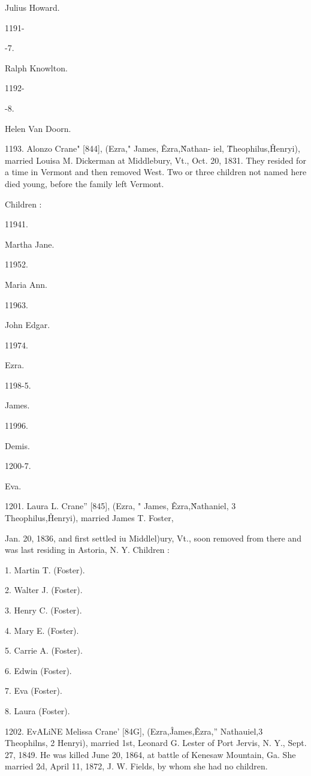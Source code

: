 Julius Howard. 


1191- 


-7. 


Ralph Knowlton. 


1192- 


-8. 


Helen Van Doorn. 



1193. Alonzo Crane" [844], (Ezra," James, \^ Ezra,\^ Nathan- 
iel, \^ Theophilus,\^ Henryi), married Louisa M. Dickerman at 
Middlebury, Vt., Oct. 20, 1831. They resided for a time in 
Vermont and then removed West. Two or three children not 
named here died young, before the family left Vermont. 

Children : 



11941. 


Martha Jane. 


11952. 


Maria Ann. 


11963. 


John Edgar. 


11974. 


Ezra. 


1198-5. 


James. 


11996. 


Demis. 


1200-7. 


Eva. 



1201. Laura L. Crane'' [845], (Ezra, " James, \^ Ezra,\^ 
Nathaniel, 3 Theophilus,\^ Henryi), married James T. Foster, 




Jan. 20, 1836, and first settled iu Middlel)ury, Vt., soon removed 
from there and was last residing in Astoria, N. Y. Children : 

1. Martin T. (Foster). 

2. Walter J. (Foster). 

3. Henry C. (Foster). 

4. Mary E. (Foster). 

5. Carrie A. (Foster). 

6. Edwin (Foster). 

7. Eva (Foster). 

8. Laura (Foster). 

1202. EvALiNE Melissa Crane' [84G], (Ezra,\^ James,\^ Ezra,'' 
Nathauiel,3 Theophilns, 2 Henryi), married 1st, Leonard G. Lester 
of Port Jervis, N. Y., Sept. 27, 1849. He was killed June 20, 
1864, at battle of Kenesaw Mountain, Ga. She married 2d, 
April 11, 1872, J. W. Fields, by whom she had no children. 

